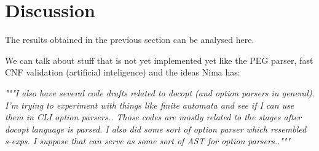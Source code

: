 \section{Discussion}

The results obtained in the previous section can be analysed here.

We can talk about stuff that is not yet implemented yet like the PEG parser, fast CNF validation (artificial inteligence) and the ideas Nima has:

\emph{"""I also have several code drafts related to docopt (and option parsers
in general). I'm trying to experiment with things like finite automata
and see if I can use them in CLI option parsers.. Those codes are
mostly related to the stages after docopt language is parsed. I also
did some sort of option parser which resembled s-exps. I suppose that
can serve as some sort of AST for option parsers.."""}

